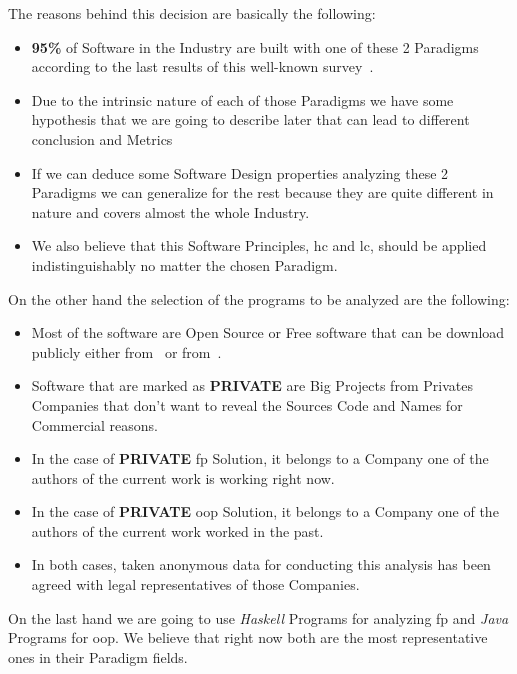 \documentclass[12pt, a4paper]{article}
\begin{document}
The reasons behind this decision are basically the following:

\begin{itemize}
    \item \textbf{95\%} of Software in the Industry are built with one of these 2 Paradigms according to the last results of this well-known survey~\cite{so_survey}.
    \item Due to the intrinsic nature of each of those Paradigms we have some hypothesis that we are going to describe later that can lead to different conclusion and Metrics
    \item If we can deduce some Software Design properties analyzing these 2 Paradigms we can generalize for the rest because they are quite different in nature and covers almost the whole Industry.
    \item We also believe that this Software Principles, \acrshort{hc} and \acrshort{lc}, should be applied indistinguishably no matter the chosen Paradigm. 
\end{itemize}

On the other hand the selection of the programs to be analyzed are the following:

\begin{itemize}
    \item Most of the software are Open Source or Free software that can be download publicly either from~\cite{github} or from~\cite{maven_repo}.
    \item Software that are marked as \textbf{PRIVATE} are Big Projects from Privates Companies that don't want to reveal the Sources Code and Names for Commercial reasons.
    \item In the case of \textbf{PRIVATE} \acrshort{fp} Solution, it belongs to a Company one of the authors of the current work is working right now.
    \item In the case of \textbf{PRIVATE} \acrshort{oop} Solution, it belongs to a Company one of the authors of the current work worked in the past.
    \item In both cases, taken anonymous data for conducting this analysis has been agreed with legal representatives of those Companies.
\end{itemize}

On the last hand we are going to use \textit{Haskell} Programs for analyzing \acrlong{fp} and \textit{Java} Programs for \acrlong{oop}. We believe that right now both are the most representative
ones in their Paradigm fields.
\end{document}
